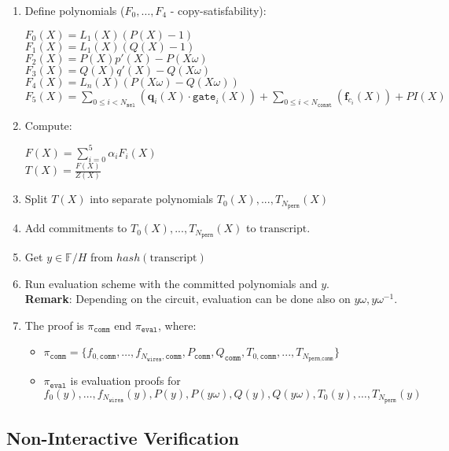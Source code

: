 \begin{enumerate}
	\item Define polynomials ($F_0, \dots, F_4$ - copy-satisfability):
	\begin{center}
		$F_0(X) = L_1(X)(P(X) - 1)$\\
		$F_1(X) = L_1(X)(Q(X) - 1)$ \\
		$F_2(X) = P(X)p'(X) - P(X\omega)$ \\
		$F_3(X) = Q(X)q'(X) - Q(X\omega)$ \\
		$F_4(X) = L_n(X)(P(X\omega) - Q(X\omega))$ \\
		$F_5(X) = \sum\limits_{0 \leq i < N_{\texttt{sel}}} (\textbf{q}_{i}(X) \cdot \texttt{gate}_i(X))
			+ \sum\limits_{0 \leq i < N_{\texttt{const}}}(\textbf{f}_{c_i}(X)) + PI(X)$
	\end{center}
	\item Compute:
	\begin{center}
		$F(X) = \sum\limits_{i = 0}^5 \alpha_iF_i(X)$ \\
		$T(X) = \frac{F(X)}{Z(X)}$
	\end{center}
	\item Split $T(X)$ into separate polynomials $T_0(X), ..., T_{N_{\texttt{perm}}}(X)$
	\item Add commitments to $T_0(X), ..., T_{N_{\texttt{perm}}}(X)$ to $\text{transcript}$.
	\item Get $y \in \mathbb{F}/H$ from $hash(\text{transcript})$
	\item Run evaluation scheme with the committed polynomials and $y$. \\
	\textbf{Remark}: Depending on the circuit, evaluation can be done also on $y\omega, y\omega^{-1}$.
	\item The proof is $\pi_{\texttt{comm}}$ end $\pi_{\texttt{eval}}$, where:
		\begin{itemize}
			\item $\pi_{\texttt{comm}} = \{f_{0, \texttt{comm}}, \dots, f_{N_{\texttt{wires}}, \texttt{comm}},
			 P_{\texttt{comm}}, Q_{\texttt{comm}}, T_{0, \texttt{comm}}, ..., T_{N_{\texttt{perm}, \texttt{comm}}} \}$
			 \item  $\pi_{\texttt{eval}}$ is evaluation proofs for $f_0(y), \dots, f_{N_{\texttt{wires}}}(y), P(y), P(y\omega), Q(y), Q(y\omega), T_0(y), \dots, T_{N_{\texttt{perm}}}(y)$
		\end{itemize}
\end{enumerate}

\subsection{Non-Interactive Verification}

